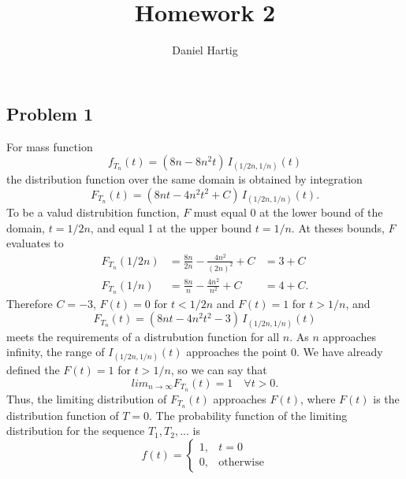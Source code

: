 \documentclass{article}
\title{Homework 2}
\author{Daniel Hartig}
\begin{document}
\maketitle

\subsection*{Problem 1}

For mass function $$f_{T_n}(t) = (8n-8n^2t)\, I_{(1/2n, 1/n)}(t)$$ the distribution function over the same domain is obtained by integration $$F_{T_n}(t) = (8nt - 4n^2t^2 + C)\, I_{(1/2n, 1/n)}(t).$$ To be a valud distrubition function, $F$ must equal 0 at the lower bound of the domain, $t = 1/2n$, and equal 1 at the upper bound $t = 1/n$. At theses bounds, $F$ evaluates to 
\[\begin{aligned}
F_{T_n}(1/2n) &= \frac{8n}{2n} - \frac{4n^2}{(2n)^2} + C &= 3 + C \\
F_{T_n}(1/n)&= \frac{8n}{n} - \frac{4n^2}{n^2} + C &= 4 + C.
\end{aligned}\]
Therefore $C = -3$, $F(t) = 0$ for $ t<1/2n$ and $F(t) = 1$ for $ t > 1/n$, and \[F_{T_n}(t) = (8nt - 4n^2t^2 -3)\, I_{(1/2n, 1/n)}(t)\] meets the requirements of a distrubution function for all $n$. As $n$ approaches infinity, the range of $I_{(1/2n, 1/n)}(t)$ approaches the point $0$. We have already defined the $F(t) = 1$ for $ t > 1/n$, so we can say that \[lim_{n\to\infty} F_{T_n}(t) = 1\quad \forall t > 0.\] Thus, the limiting distribution of $F_{T_n}(t)$ approaches $F(t)$, where $F(t)$ is the distribution function of $T = 0$. The probability function of the limiting distribution for the sequence $T_1, T_2, ...$ is  
\[f(t) = \begin{cases}
1, &t = 0 \\
0, &\text{otherwise}
\end{cases}\]

\iffalse
As $n\to\infty$, the mass function \[f_{T_n}(t) = (8n-8n^2t)\, I_{(1/2n, 1/n)}(t)\] approaches different values in its upper and lower bounds in $t$. At $t = 1/n$, \[\lim_{n\to\infty} (8n-8n^2t) = \lim_{n\to\infty} 8n-\frac{8n^2}{n} = 0.\] while at $t=1/2n$, \[\lim_{n\to\infty} (8n-8n^2t) = \lim_{n\to\infty} 8n-\frac{8n^2}{2n} = \lim_{n\to\infty} 4n = \infty.\] Meanwhile the domain of $t$ becomes $(1/2n, 1/n) = (0, 0)$. Thus the limiting distribution for $f_{T_n}$ is a vertical line at $t=0$, where the image of $f_{T_n}$ is all non-negative real numbers. 
\fi
\end{document}

